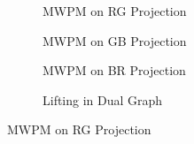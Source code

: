 \documentclass{article}
\begin{document}
\begin{figure}[ht]
    \centering
    \begin{subfigure}{0.2375\textwidth}
        \centering
        \resizebox{\textwidth}{!}{}
        \caption{MWPM on RG Projection}
    \end{subfigure}
    \hfill
    \begin{subfigure}{0.2375\textwidth}
        \centering
        \resizebox{\textwidth}{!}{}
        \caption{MWPM on GB Projection}
    \end{subfigure}
    \hfill
    \begin{subfigure}{0.2375\textwidth}
        \centering
        \resizebox{\textwidth}{!}{}
        \caption{MWPM on BR Projection}
    \end{subfigure}
    \vspace{0.5cm}
    \begin{subfigure}{0.2375\textwidth}
        \centering
        \resizebox{\textwidth}{!}{}
        \caption{Lifting in Dual Graph}
    \end{subfigure}
    
    \vspace{0.5cm}
    \caption{MWPM on RG Projection}
\end{figure}
\end{document}

